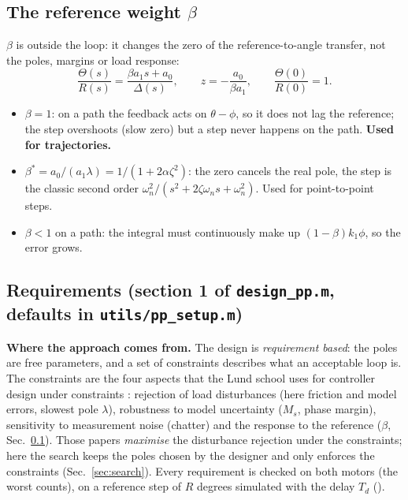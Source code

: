 \documentclass[10pt,a4paper]{article}
\newcommand{\code}[1]{\texttt{\detokenize{#1}}}
\begin{document}
\subsection{The reference weight $\beta$}\label{sec:beta}
$\beta$ is outside the loop: it changes the zero of the reference-to-angle transfer, not the poles, margins or load response:
\begin{equation}
  \frac{\Theta(s)}{R(s)}=\frac{\beta a_1 s+a_0}{\Delta(s)},\qquad z=-\frac{a_0}{\beta a_1},\qquad \frac{\Theta(0)}{R(0)}=1 .
\end{equation}
\begin{itemize}
  \item $\beta=1$: on a path the feedback acts on $\theta-\phi$, so it does not lag the reference; the step overshoots
        (slow zero) but a step never happens on the path. \textbf{Used for trajectories.}
  \item $\beta^*=a_0/(a_1\lambda)=1/(1+2\alpha\zeta^2)$: the zero cancels the real pole, the step is the classic second
        order $\omega_n^2/(s^2+2\zeta\omega_n s+\omega_n^2)$. Used for point-to-point steps.
  \item $\beta<1$ on a path: the integral must continuously make up $(1-\beta)k_1\phi$, so the error grows.
\end{itemize}

\subsection{Requirements (section 1 of \texttt{design\_pp.m}, defaults in \texttt{utils/pp\_setup.m})}\label{sec:req}
\textbf{Where the approach comes from.} The design is \emph{requirement based}: the poles are free parameters, and a set of
constraints describes what an acceptable loop is. The constraints are the four aspects that the Lund school uses for
controller design under constraints \cite{Astrom1998,Panagopoulos2002,Garpinger2014}: rejection of load disturbances
(here friction and model errors, slowest pole $\lambda$), robustness to model uncertainty ($M_s$, phase margin),
sensitivity to measurement noise (chatter) and the response to the reference ($\beta$, Sec.~\ref{sec:beta}). Those papers
\emph{maximise} the disturbance rejection under the constraints; here the search keeps the poles chosen by the designer and
only enforces the constraints (Sec.~\ref{sec:search}). Every requirement is checked on both motors (the worst counts), on a
reference step of $R$ degrees simulated with the delay $T_d$ (\code{closed_loop.m}).
\end{document}
